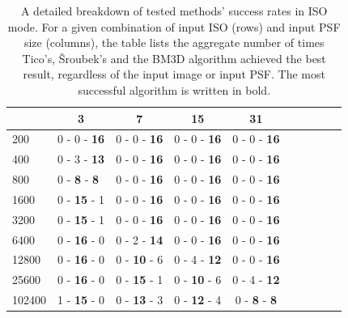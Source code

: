 \documentclass[12pt,notitlepage]{report}
\begin{document}
\begin{table}[h]
  \centering
  \begin{tabular}{ | l | c | c | c | c | c | c | c | c | c |}
    \hline
		   & 3 & 7 & 15 & 31 \\ \hline
	200    & 0 - 0 - \textbf{16} & 0 - 0 - \textbf{16} & 0 - 0 - \textbf{16} & 0 - 0 - \textbf{16} \\ \hline
	400    & 0 - 3 - \textbf{13} & 0 - 0 - \textbf{16} & 0 - 0 - \textbf{16} & 0 - 0 - \textbf{16} \\ \hline
	800    & 0 - \textbf{8} - \textbf{8}~ & 0 - 0 - \textbf{16} & 0 - 0 - \textbf{16} & 0 - 0 - \textbf{16} \\ \hline
	1600   & 0 - \textbf{15} - 1 & 0 - 0 - \textbf{16} & 0 - 0 - \textbf{16} & 0 - 0 - \textbf{16} \\ \hline
	3200   & 0 - \textbf{15} - 1 & 0 - 0 - \textbf{16} & 0 - 0 - \textbf{16} & 0 - 0 - \textbf{16} \\ \hline
	6400   & 0 - \textbf{16} - 0 & 0 - 2 - \textbf{14} & 0 - 0 - \textbf{16} & 0 - 0 - \textbf{16} \\ \hline
	12800  & 0 - \textbf{16} - 0 & 0 - \textbf{10} - 6 & 0 - 4 - \textbf{12} & 0 - 0 - \textbf{16} \\ \hline
	25600  & 0 - \textbf{16} - 0 & 0 - \textbf{15} - 1 & 0 - \textbf{10} - 6 & 0 - 4 - \textbf{12} \\ \hline
	102400 & 1 - \textbf{15} - 0 & 0 - \textbf{13} - 3 & 0 - \textbf{12} - 4 & 0 - \textbf{8} - \textbf{8} \\ \hline
  \end{tabular}
  \caption[A detailed breakdown of tested methods' success rates in ISO mode]{A detailed breakdown of tested methods' success rates in ISO mode. For a given combination of input ISO (rows) and input PSF size (columns), the table lists the aggregate number of times Tico's, Šroubek's and the BM3D algorithm achieved the best result, regardless of the input image or input PSF. The most successful algorithm is written in bold.}
  \label{tab:iso_mode_breakdown}
\end{table}
\end{document}
